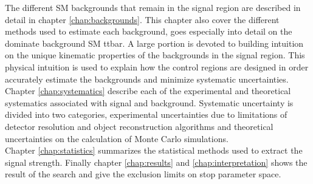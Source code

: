 \indent The different SM backgrounds that remain in the signal region are described in detail in chapter \ref{chap:backgrounds}.  This chapter also cover the different methods used to estimate each background, goes especially into detail on the dominate background SM ttbar.  A large portion is devoted to building intuition on the unique kinematic properties of the backgrounds in the signal region.  This physical intuition is used to explain how the control regions are designed in order accurately estimate the backgrounds and minimize systematic uncertainties.  \\

\indent Chapter \ref{chap:systematics} describe each of the experimental and theoretical systematics associated with signal and background.  Systematic uncertainty is divided into two categories, experimental uncertainties due to limitations of detector resolution and object reconstruction algorithms and theoretical uncertainties on the calculation of Monte Carlo simulations. \\

\indent Chapter \ref{chap:statistics} summarizes the statistical methods used to extract the signal strength.  Finally chapter \ref{chap:results} and \ref{chap:interpretation} shows the result of the search and give the exclusion limits on stop parameter space.  \\



